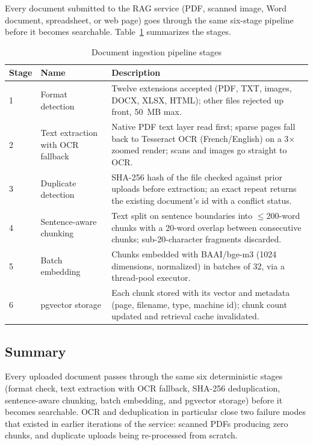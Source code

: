 Every document submitted to the RAG service (PDF, scanned image, Word document, spreadsheet, or web page) goes through the same six-stage pipeline before it becomes searchable. Table~\ref{tab:ingestion} summarizes the stages.

\begin{table}[H]
\centering
\begin{tabularx}{\textwidth}{|l|l|X|}
\hline
\textbf{Stage} & \textbf{Name} & \textbf{Description} \\
\hline
1 & Format detection & Twelve extensions accepted (PDF, TXT, images, DOCX, XLSX, HTML); other files rejected up front, 50~MB max. \\
\hline
2 & Text extraction with OCR fallback & Native PDF text layer read first; sparse pages fall back to Tesseract OCR (French/English) on a 3$\times$ zoomed render; scans and images go straight to OCR. \\
\hline
3 & Duplicate detection & SHA-256 hash of the file checked against prior uploads before extraction; an exact repeat returns the existing document's id with a conflict status. \\
\hline
4 & Sentence-aware chunking & Text split on sentence boundaries into $\leq$200-word chunks with a 20-word overlap between consecutive chunks; sub-20-character fragments discarded. \\
\hline
5 & Batch embedding & Chunks embedded with BAAI/bge-m3 (1024 dimensions, normalized) in batches of 32, via a thread-pool executor. \\
\hline
6 & pgvector storage & Each chunk stored with its vector and metadata (page, filename, type, machine id); chunk count updated and retrieval cache invalidated. \\
\hline
\end{tabularx}
\caption{Document ingestion pipeline stages}
\label{tab:ingestion}
\end{table}

\subsection{Summary}

Every uploaded document passes through the same six deterministic stages (format check, text extraction with OCR fallback, SHA-256 deduplication, sentence-aware chunking, batch embedding, and pgvector storage) before it becomes searchable. OCR and deduplication in particular close two failure modes that existed in earlier iterations of the service: scanned PDFs producing zero chunks, and duplicate uploads being re-processed from scratch.

